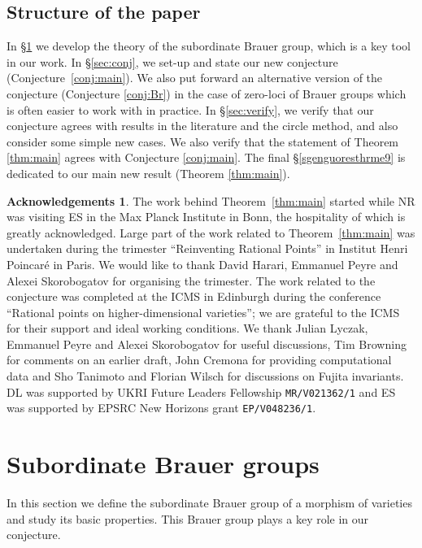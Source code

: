 \documentclass[a4paper,12pt,reqno]{amsart}
\numberwithin{equation}{section} \numberwithin{figure}{section}
\renewcommand{\#}{\sharp}
\theoremstyle{definition}
\newtheorem*{ack}{Acknowledgements}
\numberwithin{lemma}{section}
\begin{document}
\subsection{Structure of the paper}
In \S \ref{sec:Sub_Brauer} we develop the theory of the subordinate Brauer group, which is a key tool in our work. In \S \ref{sec:conj}, we set-up and state our new conjecture (Conjecture~\ref{conj:main}). We also put forward an alternative version of the conjecture (Conjecture \ref{conj:Br}) in the case of zero-loci of Brauer groups which is often easier to work with in practice. In \S \ref{sec:verify}, we verify that our conjecture agrees with results in the literature and the circle method, and also consider some simple new cases. We also verify that the statement of Theorem \ref{thm:main} agrees with Conjecture \ref{conj:main}.
The final \S \ref{sgenguoresthrme9}  is dedicated to our main new result (Theorem \ref{thm:main}).

\begin{ack}
The work behind Theorem~\ref{thm:main} started while NR was visiting ES in the Max Planck Institute in Bonn, the hospitality of which is greatly acknowledged. 
Large part of the work related to Theorem~\ref{thm:main}    was undertaken  during the trimester ``Reinventing Rational Points'' in Institut Henri Poincar\'e in Paris. 
We would like to thank  David Harari, Emmanuel Peyre and Alexei Skorobogatov for organising the trimester. 
The work related to the conjecture was completed
at the ICMS in Edinburgh during the conference ``Rational points on higher-dimensional varieties''; we are grateful to the ICMS for their support and ideal working conditions. We thank Julian Lyczak, Emmanuel Peyre and Alexei Skorobogatov for useful discussions, 
Tim Browning for comments on an earlier draft,
John Cremona for providing computational data
and Sho Tanimoto and Florian Wilsch for discussions on Fujita invariants. DL was supported by UKRI Future Leaders Fellowship \texttt{MR/V021362/1} and ES was 
supported by  
EPSRC
 New Horizons  
grant \texttt{EP/V048236/1}. 

 
\end{ack}

\section{Subordinate Brauer groups} \label{sec:Sub_Brauer}
In this section we define the subordinate Brauer group of a morphism of varieties and study its basic properties. This Brauer group plays a key role in our conjecture. 
\end{document}
